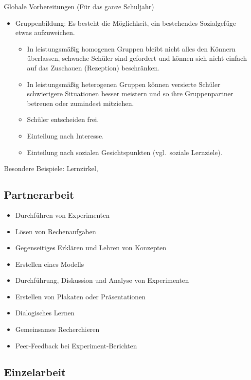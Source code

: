 Globale Vorbereitungen (F\"{u}r das ganze Schuljahr)
\begin{itemize}
\item
Gruppenbildung: Es besteht die M\"{o}glichkeit, ein bestehendes
Sozialgef\"{u}ge etwas aufzuweichen.
\begin{itemize}
\item
In leistungsm\"{a}{\ss}ig homogenen Gruppen
bleibt nicht alles den K\"{o}nnern \"{u}berlassen, schwache
Sch\"{u}ler sind gefordert und k\"{o}nnen sich nicht einfach auf
das Zuschauen (Rezeption) beschr\"{a}nken.
\item
In leistungsm\"{a}{\ss}ig heterogenen Gruppen k\"{o}nnen versierte
Sch\"{u}ler schwierigere Situationen besser meistern und so ihre
Gruppenpartner betreuen oder zumindest mitziehen.
\item
Sch\"{u}ler entscheiden frei.
\item
Einteilung nach Interesse.
\item
Einteilung nach sozialen Gesichtspunkten (vgl.\ soziale Lernziele).
\end{itemize}
\end{itemize}

Besondere Beispiele: Lernzirkel,


\subsection{Partnerarbeit}

\begin{itemize}
\item Durchf\"{u}hren von Experimenten
\item L\"{o}sen von Rechenaufgaben
\item Gegenseitiges Erkl\"{a}ren und Lehren von Konzepten
\item Erstellen eines Modells
\item Durchf\"{u}hrung, Diskussion und Analyse von Experimenten
\item Erstellen von Plakaten oder Pr\"{a}sentationen
\item Dialogisches Lernen
\item Gemeinsames Recherchieren
\item Peer-Feedback bei Experiment-Berichten
\end{itemize}


\subsection{Einzelarbeit}

